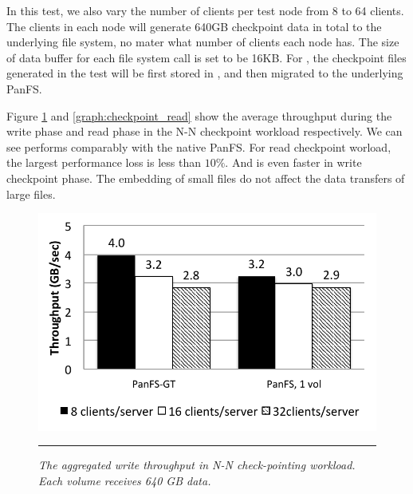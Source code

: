In this test, we also vary the number of clients per test node
from 8 to 64 clients. The clients in each node will generate
640GB checkpoint data in total to the underlying file system,
no mater what number of clients each node has.
The size of data buffer for each file system call is set to be 16KB.
For \psys, the checkpoint files generated in the test will be
first stored in \tfs, and then migrated to the underlying PanFS.

Figure \ref{graph:checkpoint_write} and \ref{graph:checkpoint_read}
show the average throughput during the write phase and read phase
in the N-N checkpoint workload respectively. We can see \psys
performs comparably with the native PanFS.
For read checkpoint worload, the largest performance loss is less than $10\%$.
And \psys is even faster in write checkpoint phase.
The embedding of small files do not affect the data transfers
of large files.

\begin{figure}[t]  %
\centerline{\includegraphics[scale=0.7]{./figs/checkpointing_write}}
\vspace{10pt}
\caption{\footnotesize
\textit{
The aggregated write throughput in N-N check-pointing workload.
Each volume receives 640 GB data.
}
}
\hrule
\label{graph:checkpoint_write}
\end{figure}       %

